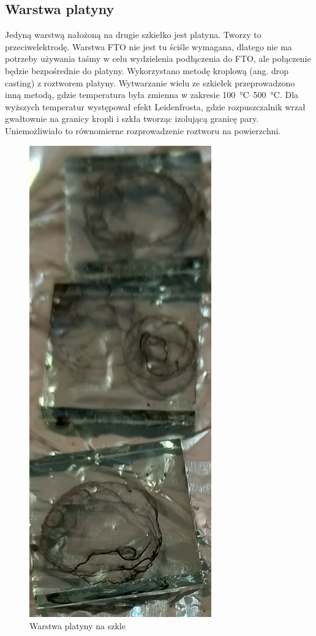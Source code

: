 \documentclass[a4, 12pt]{article}
\begin{document}
	\subsection{Warstwa platyny}
	Jedyną warstwą nałożoną na drugie szkiełko jest platyna. Tworzy to przeciwelektrodę. Warstwa FTO nie jest tu ściśle wymagana, dlatego nie ma potrzeby używania taśmy w celu wydzielenia podłączenia do FTO, ale połączenie będzie bezpośrednie do platyny. Wykorzystano metodę kroplową (ang. drop casting) z roztworem platyny. Wytwarzanie wielu ze szkiełek przeprowadzono inną metodą, gdzie temperatura była zmienna w zakresie \qtyrange{100}{500}{\degreeCelsius}. Dla wyższych temperatur występował efekt Leidenfrosta, gdzie rozpuszczalnik wrzał gwałtownie na granicy kropli i szkła tworząc izolującą granicę pary. Uniemożliwiało to równomierne rozprowadzenie roztworu na powierzchni. 
	\begin{figure}[H]
		\centering
		\includegraphics[angle=90, width=0.7\textwidth]{probki_platyna.png}
		\caption{Warstwa platyny na szkle}
	\end{figure}
	
\end{document}
